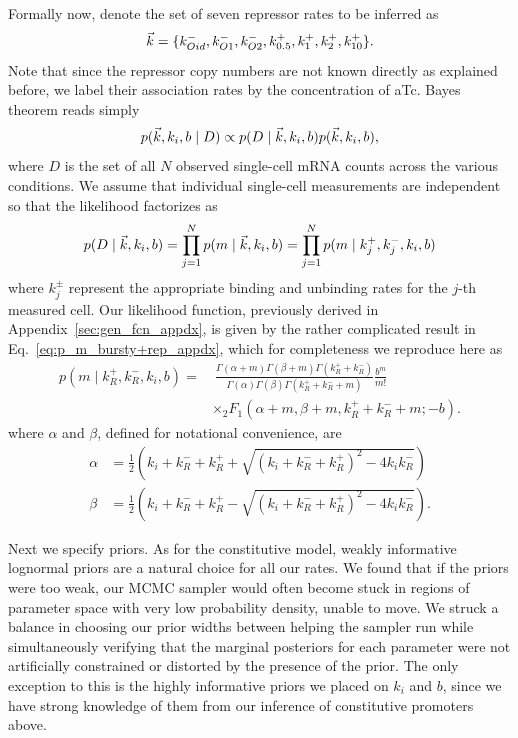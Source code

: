 Formally now, denote the set of seven repressor rates to be inferred as
\begin{equation}
\vec{k} =\{k_{Oid}^-, k_{O1}^-, k_{O2}^-,
k_{0.5}^+, k_{1}^+, k_{2}^+, k_{10}^+\}.
\end{equation}
Note that since the repressor copy numbers are not known directly as explained
before, we label their association rates by the concentration of aTc. Bayes
theorem reads simply
\begin{equation}
p(\vec{k}, k_i, b \mid D)
\propto
p(D \mid\vec{k}, k_i, b) p(\vec{k}, k_i, b),
\end{equation}
where $D$ is the set of all $N$ observed single-cell mRNA counts across the
various conditions. We assume that individual single-cell measurements are
independent so that the likelihood factorizes as
\begin{equation}
p(D \mid\vec{k}, k_i, b)
= \prod_{j=1}^N p(m\mid \vec{k}, k_i, b)
= \prod_{j=1}^N p(m\mid k_j^+, k_j^-, k_i, b)
\end{equation}
where $k_j^\pm$ represent the appropriate binding and unbinding rates for the
$j$-th measured cell. Our likelihood function, previously derived in
Appendix~\ref{sec:gen_fcn_appdx}, is given by the rather complicated result in
Eq.~\ref{eq:p_m_bursty+rep_appdx}, which for completeness we reproduce here as
\begin{equation}
\begin{split}
p(m \mid k_R^+, k_R^-, k_i, b) = & ~\frac{
        \Gamma(\alpha + m)\Gamma(\beta + m)\Gamma(k_R^+ + k_R^-)
        }
        {
        \Gamma(\alpha)\Gamma(\beta)\Gamma(k_R^+ + k_R^- + m)
        }
\frac{b^m}{m!}
\\
&\times {_2F_1}(\alpha+m, \beta+m, k_R^++k_R^-+m; -b).
\end{split}
\label{eq:p_m_bursty+rep_infreprint}
\end{equation}
where $\alpha$ and $\beta$, defined for notational convenience, are
\begin{equation}
\begin{split}
\alpha &= \frac{1}{2}
\left(k_i+k_R^-+k_R^+ + \sqrt{(k_i+k_R^-+k_R^+)^2 - 4k_i k_R^-}\right)
\\
\beta &= \frac{1}{2}
\left(k_i+k_R^-+k_R^+ - \sqrt{(k_i+k_R^-+k_R^+)^2 - 4k_i k_R^-}\right).
\end{split}
\end{equation}

Next we specify priors. As for the constitutive model, weakly informative
lognormal priors are a natural choice for all our rates. We found that if the
priors were too weak, our MCMC sampler would often become stuck in regions of
parameter space with very low probability density, unable to move. We struck a
balance in choosing our prior widths between helping the sampler run while
simultaneously verifying that the marginal posteriors for each parameter were
not artificially constrained or distorted by the presence of the prior. The only
exception to this is the highly informative priors we placed on $k_i$ and $b$,
since we have strong knowledge of them from our inference of constitutive
promoters above.

